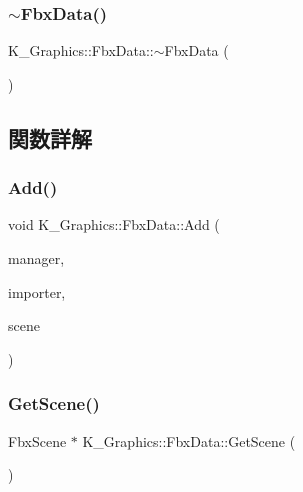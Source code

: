 \subsubsection{\texorpdfstring{$\sim$\+Fbx\+Data()}{~FbxData()}}
{\footnotesize\ttfamily K\+\_\+\+Graphics\+::\+Fbx\+Data\+::$\sim$\+Fbx\+Data (\begin{DoxyParamCaption}{ }\end{DoxyParamCaption})}



\subsection{関数詳解}
\mbox{\label{class_k___graphics_1_1_fbx_data_a7dd8e6081a69857bb6b2d40473bb8713}} 
\subsubsection{\texorpdfstring{Add()}{Add()}}
{\footnotesize\ttfamily void K\+\_\+\+Graphics\+::\+Fbx\+Data\+::\+Add (\begin{DoxyParamCaption}\item[{Fbx\+Manager $\ast$}]{manager,  }\item[{Fbx\+Importer $\ast$}]{importer,  }\item[{Fbx\+Scene $\ast$}]{scene }\end{DoxyParamCaption})}

\mbox{\label{class_k___graphics_1_1_fbx_data_a8271d5aa74bb8795fb601bcb60ce5f6f}} 
\subsubsection{\texorpdfstring{Get\+Scene()}{GetScene()}}
{\footnotesize\ttfamily Fbx\+Scene $\ast$ K\+\_\+\+Graphics\+::\+Fbx\+Data\+::\+Get\+Scene (\begin{DoxyParamCaption}{ }\end{DoxyParamCaption})}

